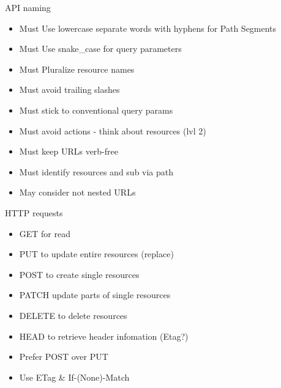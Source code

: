 \documentclass[10pt]{beamer}
\begin{document}
\begin{frame}{API naming}

  \begin{itemize}

    \item
          Must Use lowercase separate words with hyphens for Path Segments
    \item
          Must Use snake\_case for query parameters
    \item
          Must Pluralize resource names
    \item
          Must avoid trailing slashes
    \item
          Must stick to conventional query params
    \item
          Must avoid actions - think about resources (lvl 2)
    \item
          Must keep URLs verb-free
    \item
          Must identify resources and sub via path
    \item
          May consider not nested URLs
  \end{itemize}

\end{frame}

\begin{frame}{HTTP requests}

  \begin{itemize}

    \item
          GET for read
    \item
          PUT to update entire resources (replace)
    \item
          POST to create single resources
    \item
          PATCH update parts of single resources
    \item
          DELETE to delete resources
    \item
          HEAD to retrieve header infomation (Etag?)
    \item
          Prefer POST over PUT
    \item
          Use ETag \& If-(None)-Match
  \end{itemize}

\end{frame}
\end{document}
